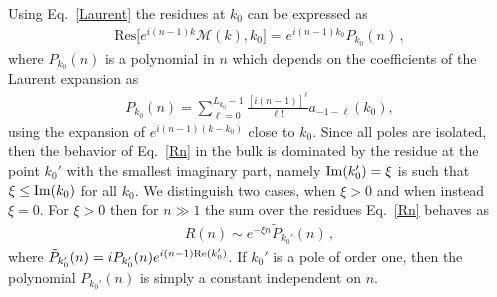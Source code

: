 \documentclass[pra,twocolumn,
superscriptaddress,
showpacs,
aps
]{revtex4-1}
\begin{document}
Using Eq.~\eqref{Laurent} the residues at $k_0$ can be expressed as 
\begin{align}
\label{R:fig}
\mathrm{Res}\big[e^{i(n-1)k}{\mathcal M}(k),k_0\big]=e^{i(n-1)k_0}P_{k_0}(n)\,,
\end{align}
where $P_{k_0}(n)$ is a polynomial in $n$ which depends on the coefficients of the Laurent expansion as
\begin{align}
P_{k_0}(n)=\sum_{\ell=0}^{L_{k_0}-1}\frac{[i(n-1)]^{\ell}}{\ell!}a_{-1-\ell}(k_0),
\end{align}
using the expansion of $e^{i(n-1)(k-k_0)}$ close to $k_0$. 
Since all poles are isolated, then the behavior of Eq.~\eqref{Rn} in the bulk is dominated by the residue at the point $k_0'$ with the smallest imaginary part, namely ${\rm Im}(k_0')=\xi$ is such that 
${\xi\le {\rm Im}(k_0)}$ for all $k_0$. We distinguish two cases, when $\xi>0$ and when instead $\xi=0$. For $\xi>0$  then for $n\gg 1$ the sum over the residues Eq.~\eqref{Rn} behaves as
\begin{align}
\label{R:exp}
R(n) \sim e^{-\xi n}\tilde P_{k_0'}(n)\,,
\end{align}
%
where $\tilde P_{k_0'}(n)= iP_{k_0'}(n)e^{i(n-1){\rm Re}(k_0')}$.  If $k_0'$ is a pole of order one, then the polynomial $P_{k_0'}(n)$ is simply a constant independent on $n$.
\end{document}
